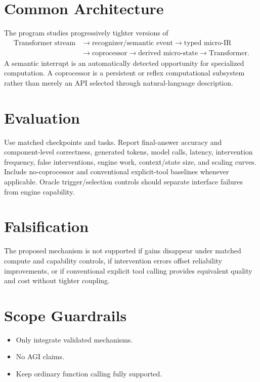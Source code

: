 \documentclass[11pt]{article}
\begin{document}
\section{Common Architecture}
The program studies progressively tighter versions of
\[
\begin{aligned}
\text{Transformer stream}
&\rightarrow \text{recognizer/semantic event}
\rightarrow \text{typed micro-IR} \\
&\rightarrow \text{coprocessor}
\rightarrow \text{derived micro-state}
\rightarrow \text{Transformer}.
\end{aligned}
\]
A semantic interrupt is an automatically detected opportunity for specialized computation. A coprocessor is a persistent or reflex computational subsystem rather than merely an API selected through natural-language description.

\section{Evaluation}
Use matched checkpoints and tasks. Report final-answer accuracy and component-level correctness, generated tokens, model calls, latency, intervention frequency, false interventions, engine work, context/state size, and scaling curves. Include no-coprocessor and conventional explicit-tool baselines whenever applicable. Oracle trigger/selection controls should separate interface failures from engine capability.

\section{Falsification}
The proposed mechanism is not supported if gains disappear under matched compute and capability controls, if intervention errors offset reliability improvements, or if conventional explicit tool calling provides equivalent quality and cost without tighter coupling.

\section{Scope Guardrails}
\begin{itemize}
\item Only integrate validated mechanisms.
\item No AGI claims.
\item Keep ordinary function calling fully supported.
\end{itemize}
\end{document}
